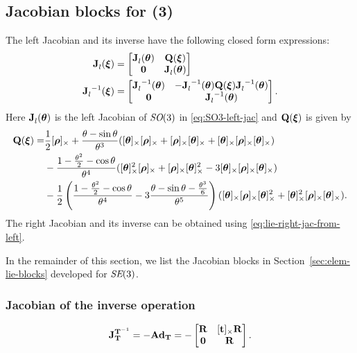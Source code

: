 \subsection{Jacobian blocks for \SE(3)} \label{sec:Jacobians-SE3}
The left Jacobian and its inverse have the following closed form expressions: 
\begin{align}
{{\boldsymbol{\mathbf{J}}}^{}_{l}}({\boldsymbol{\mathbf{\xi}}}) &= 
\begin{bmatrix}
  {{\boldsymbol{\mathbf{J}}}^{}_{l}}({\boldsymbol{\mathbf{\theta}}}) & {\boldsymbol{\mathbf{Q}}}({\boldsymbol{\mathbf{\xi}}}) \\
  \boldsymbol{\mathbf{0}} & {{\boldsymbol{\mathbf{J}}}^{}_{l}}({\boldsymbol{\mathbf{\theta}}})
\end{bmatrix}\\
{{\boldsymbol{\mathbf{J}}}^{}_{l}}^{-1}({\boldsymbol{\mathbf{\xi}}}) &= 
\begin{bmatrix}
  {{\boldsymbol{\mathbf{J}}}^{}_{l}}^{-1}({\boldsymbol{\mathbf{\theta}}}) & -{{\boldsymbol{\mathbf{J}}}^{}_{l}}^{-1}({\boldsymbol{\mathbf{\theta}}}) {\boldsymbol{\mathbf{Q}}}({\boldsymbol{\mathbf{\xi}}}) {{\boldsymbol{\mathbf{J}}}^{}_{l}}^{-1}({\boldsymbol{\mathbf{\theta}}}) \\
  \boldsymbol{\mathbf{0}} & {{\boldsymbol{\mathbf{J}}}^{}_{l}}^{-1}({\boldsymbol{\mathbf{\theta}}})
\end{bmatrix}.  \label{eq:jacobian-left-inverse-SE3}
\end{align}
Here ${{\boldsymbol{\mathbf{J}}}^{}_{l}}({\boldsymbol{\mathbf{\theta}}})$ is the left Jacobian of $\textit{SO}(3)$ in \eqref{eq:SO3-left-jac} and ${\boldsymbol{\mathbf{Q}}}({\boldsymbol{\mathbf{\xi}}})$ is given by
%
\newcommand{\rhox}{\skewsymm{\vecrho}}
\newcommand{\thetax}{\skewsymm{\vectheta}}
%
\begin{equation}
\begin{split}
\matQ(\vecxi) =& 
  \frac{1}{2}\rhox 
  + \frac{\theta - \sin\theta}{\theta^3}(\thetax\rhox+\rhox\thetax+\thetax\rhox\thetax)\\
  &- \frac{1 - \frac{\theta^2}{2} - \cos\theta}{\theta^4}(\thetax^2\rhox+\rhox\thetax^2-3\thetax\rhox\thetax)\\
  &-\frac{1}{2}\left(\frac{1 -  \frac{\theta^2}{2} - \cos\theta}{\theta^4} 
                  - 3\frac{\theta-\sin\theta-\frac{\theta^3}{6}}{\theta^5}\right)
                  (\thetax\rhox\thetax^2 + \thetax^2\rhox\thetax).
\end{split}
\end{equation}
%
The right Jacobian and its inverse can be obtained using \eqref{eq:lie-right-jac-from-left}.

In the remainder of this section, we list the Jacobian blocks in Section~\ref{sec:elem-lie-blocks} developed for $\textit{SE}(3)$.

\subsubsection*{Jacobian of the inverse operation}
\begin{equation}
  {{\boldsymbol{\mathbf{J}}}^{{\boldsymbol{\mathbf{T}}}^{-1}}_{{\boldsymbol{\mathbf{T}}}}} = -\boldsymbol{\mathbf{Ad}}_{\boldsymbol{\mathbf{T}}} = -
  \begin{bmatrix}
    {\boldsymbol{\mathbf{R}}} & [{\boldsymbol{\mathbf{t}}}]_\times{\boldsymbol{\mathbf{R}}}\\
    \boldsymbol{\mathbf{0}} & {\boldsymbol{\mathbf{R}}}
  \end{bmatrix}.
\end{equation}

